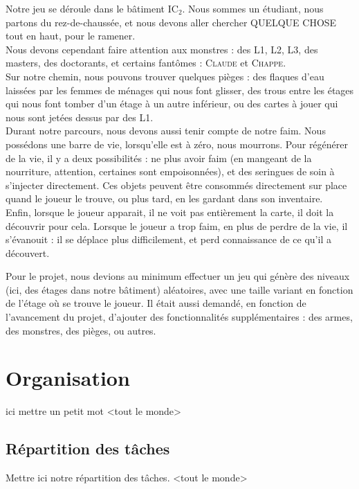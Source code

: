 \documentclass[11pt]{report}
\begin{document}
	Notre jeu se déroule dans le bâtiment IC$_2$. Nous sommes un étudiant, nous partons du rez-de-chaussée, et nous devons aller chercher QUELQUE CHOSE tout en haut, pour le ramener. \\
	Nous devons cependant faire attention aux monstres : des L1, L2, L3, des masters, des doctorants, et certains fantômes : \textsc{Claude} et \textsc{Chappe}.\\
	Sur notre chemin, nous pouvons trouver quelques pièges : des flaques d'eau laissées par les femmes de ménages qui nous font glisser, des trous entre les étages qui nous font tomber d'un étage à un autre inférieur, ou des cartes à jouer qui nous sont jetées dessus par des L1.\\
	Durant notre parcours, nous devons aussi tenir compte de notre faim. Nous possédons une barre de vie, lorsqu'elle est à zéro, nous mourrons. Pour régénérer de la vie, il y a deux possibilités : ne plus avoir faim (en mangeant de la nourriture, attention, certaines sont empoisonnées), et des seringues de soin à s'injecter directement. Ces objets peuvent être consommés directement sur place quand le joueur le trouve, ou plus tard, en les gardant dans son inventaire.\\
	Enfin, lorsque le joueur apparait, il ne voit pas entièrement la carte, il doit la découvrir pour cela. Lorsque le joueur a trop faim, en plus de perdre de la vie, il s'évanouit : il se déplace plus difficilement, et perd connaissance de ce qu'il a découvert.
	
	\vspace{12pt}
	
	Pour le projet, nous devions au minimum effectuer un jeu qui génère des niveaux (ici, des étages dans notre bâtiment) aléatoires, avec une taille variant en fonction de l'étage où se trouve le joueur. Il était aussi demandé, en fonction de l'avancement du projet, d'ajouter des fonctionnalités supplémentaires : des armes, des monstres, des pièges, ou autres.

\chapter{Organisation}

ici mettre un petit mot <tout le monde>

	\section{Répartition des tâches}
		Mettre ici notre répartition des tâches. <tout le monde>
\end{document}

